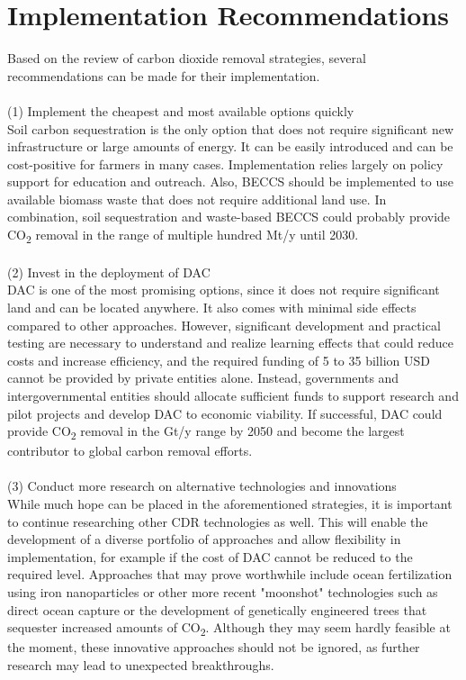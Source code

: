 \newpage
\section{Implementation Recommendations}
Based on the review of carbon dioxide removal strategies, several recommendations can be made for their implementation.\\
\\(1) Implement the cheapest and most available options quickly\\
Soil carbon sequestration is the only option that does not require significant new infrastructure or large amounts of energy. It can be easily introduced and can be cost-positive for farmers in many cases. Implementation relies largely on policy support for education and outreach. Also, BECCS should be implemented to use available biomass waste that does not require additional land use. In combination, soil sequestration and waste-based BECCS could probably provide CO\textsubscript{2} removal in the range of multiple hundred Mt/y until 2030.\\
\\(2) Invest in the deployment of DAC\\
DAC is one of the most promising options, since it does not require significant land and can be located anywhere. It also comes with minimal side effects compared to other approaches. However, significant development and practical testing are necessary to understand and realize learning effects that could reduce costs and increase efficiency, and the required funding of 5 to 35 billion USD cannot be provided by private entities alone. Instead, governments and intergovernmental entities should allocate sufficient funds to support research and pilot projects and develop DAC to economic viability. If successful, DAC could provide CO\textsubscript{2} removal in the Gt/y range by 2050 and become the largest contributor to global carbon removal efforts.\\
\\(3) Conduct more research on alternative technologies and innovations\\
While much hope can be placed in the aforementioned strategies, it is important to continue researching other CDR technologies as well. This will enable the development of a diverse portfolio of approaches and allow flexibility in implementation, for example if the cost of DAC cannot be reduced to the required level. Approaches that may prove worthwhile include ocean fertilization using iron nanoparticles or other more recent "moonshot" technologies such as direct ocean capture or the development of genetically engineered trees that sequester increased amounts of CO\textsubscript{2}. Although they may seem hardly feasible at the moment, these innovative approaches should not be ignored, as further research may lead to unexpected breakthroughs.